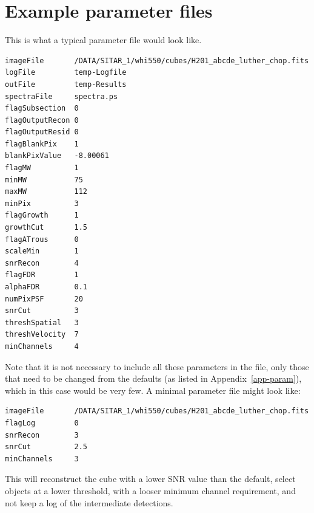 \documentclass[12pt,a4paper]{article}
\begin{document}
\newpage
\section{Example parameter files}
\label{app-input}

This is what a typical parameter file would look like.

\begin{verbatim}
imageFile       /DATA/SITAR_1/whi550/cubes/H201_abcde_luther_chop.fits
logFile         temp-Logfile
outFile         temp-Results
spectraFile     spectra.ps
flagSubsection  0
flagOutputRecon 0
flagOutputResid 0
flagBlankPix    1
blankPixValue   -8.00061
flagMW          1
minMW           75
maxMW           112
minPix          3
flagGrowth      1
growthCut       1.5
flagATrous      0
scaleMin        1
snrRecon        4
flagFDR         1
alphaFDR        0.1
numPixPSF       20
snrCut          3
threshSpatial   3
threshVelocity  7
minChannels     4
\end{verbatim}

Note that it is not necessary to include all these parameters in the
file, only those that need to be changed from the defaults (as listed
in Appendix~\ref{app-param}), which in this case would be very few. A
minimal parameter file might look like:
\begin{verbatim}
imageFile       /DATA/SITAR_1/whi550/cubes/H201_abcde_luther_chop.fits
flagLog         0
snrRecon        3
snrCut          2.5
minChannels     3
\end{verbatim}
This will reconstruct the cube with a lower SNR value than the
default, select objects at a lower threshold,  with a looser minimum
channel requirement, and not keep a log of the intermediate
detections. 
\end{document}
